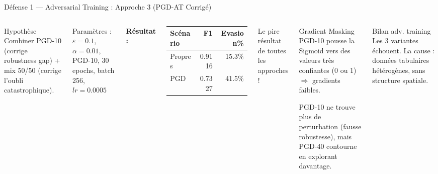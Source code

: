 \documentclass[aspectratio=169,11pt]{beamer}
\begin{document}
\begin{frame}{D\'efense 1 --- Adversarial Training : Approche 3 (PGD-AT Corrig\'e)}
\begin{columns}[T]
\begin{block}{Hypoth\`ese}
Combiner PGD-10 (corrige robustness gap) + mix 50/50 (corrige l'oubli catastrophique).
\end{block}
\vspace{0.2em}
Param\`etres : $\varepsilon=0.1$, $\alpha=0.01$, PGD-10, 30 epochs, batch 256, $lr=0.0005$

\vspace{0.3em}
\textbf{R\'esultat :}
\begin{table}
\scriptsize
\begin{tabular}{lrr}
\toprule
Sc\'enario & F1 & Evasion\% \\
\midrule
Propres & 0.9116 & 15.3\% \\
\rowcolor{myred!30}
PGD & 0.7327 & \alert{41.5\%} \\
\bottomrule
\end{tabular}
\end{table}
\alert{Le pire r\'esultat de toutes les approches !}

\begin{alertblock}{Gradient Masking}
PGD-10 pousse la Sigmoid vers des valeurs tr\`es confiantes (0 ou 1) $\Rightarrow$ gradients faibles.

\medskip
PGD-10 ne trouve plus de perturbation (fausse robustesse), mais PGD-40 contourne en explorant davantage.
\end{alertblock}
\vspace{0.3em}
\begin{block}{Bilan adv. training}
Les 3 variantes \'echouent. La cause : donn\'ees tabulaires h\'et\'erog\`enes, sans structure spatiale.
\end{block}
\end{columns}
\end{frame}
\end{document}
